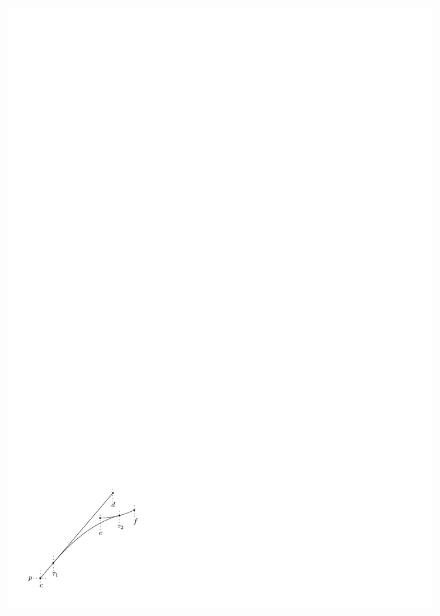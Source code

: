 \documentclass[a4paper]{article}
\theoremstyle{definition}
\theoremstyle{plain}
\begin{document}
\begin{figure}
\begin{minipage}{.45\textwidth}
  \includegraphics[width=0.9\linewidth]{figures/motion/lemma_full_acc}
  \label{fig:full_acc}
\end{minipage}
\end{figure}


\end{document}
